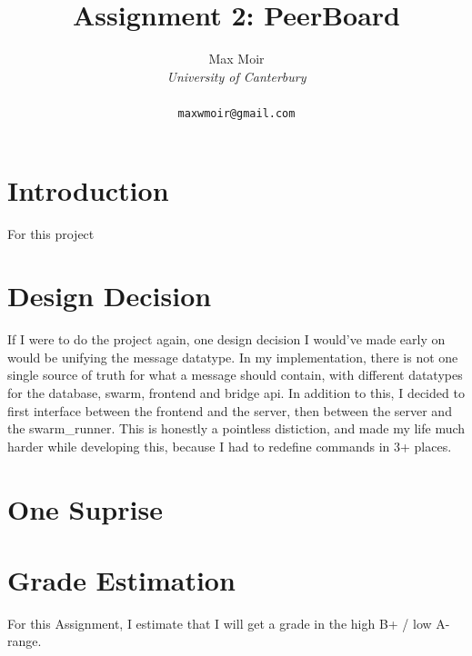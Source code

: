 \documentclass{article}
\title{Assignment 2: PeerBoard}
\author{
    Max Moir \\
    \textit{University of Canterbury} \\ 
    \text{Christchurch, New Zealand} \\ 
    \texttt{maxwmoir@gmail.com}
}
\begin{document}
\maketitle

\section{Introduction}

For this project 

\section{Design Decision}


If I were to do the project again, one design decision I would've made early on would be unifying the message datatype.
In my implementation, there is not one single source of truth for what a message should contain, with different datatypes for the database, swarm, frontend and bridge api.
In addition to this, I decided to first interface between the frontend and the server, then between the server and the swarm_runner.
This is honestly a pointless distiction, and made my life much harder while developing this, because I had to redefine commands in 3+ places.




\section{One Suprise}

\section{Grade Estimation}
For this Assignment, I estimate that I will get a grade in the high B+ / low A- range.
\end{document}

